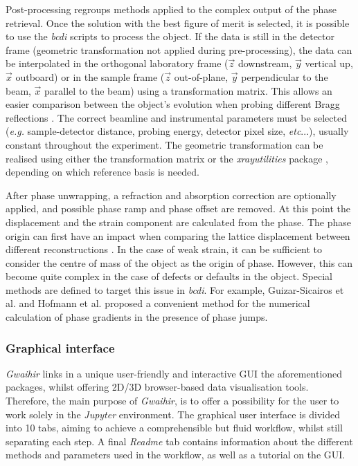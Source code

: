 Post-processing regroups methods applied to the complex output of the phase retrieval.
Once the solution with the best figure of merit is selected, it is possible to use the \textit{bcdi} scripts to process the object.
If the data is still in the detector frame (geometric transformation not applied during pre-processing), the data can be interpolated in the orthogonal laboratory frame ($\vec{z}$ downstream, $\vec{y}$ vertical up, $\vec{x}$ outboard) or in the sample frame ($\vec{z}$ out-of-plane, $\vec{y}$ perpendicular to the beam, $\vec{x}$ parallel to the beam) using a transformation matrix.
This allows an easier comparison between the object's evolution when probing different Bragg reflections \parencite{Lauraux2021}.
The correct beamline and instrumental parameters must be selected (\textit{e.g.} sample-detector distance, probing energy, detector pixel size, \textit{etc}...), usually constant throughout the experiment.
The geometric transformation can be realised using either the transformation matrix \parencite{Mark2005} or the \textit{xrayutilities} package \parencite{Kriegner2013}, depending on which reference basis is needed.

After phase unwrapping, a refraction and absorption correction are optionally applied, and possible phase ramp and phase offset are removed.
At this point the displacement and the strain component are calculated from the phase.
The phase origin can first have an impact when comparing the lattice displacement between different reconstructions \parencite{Atlan2023}.
In the case of weak strain, it can be sufficient to consider the centre of mass of the object as the origin of phase.
However, this can become quite complex in the case of defects or defaults in the object.
Special methods are defined to target this issue in \textit{bcdi}.
For example, Guizar-Sicairos et al. \parencite*{GuizarSicairos2011} and Hofmann et al. \parencite*{Hofmann2020} proposed a convenient method for the numerical calculation of phase gradients in the presence of phase jumps.

\subsubsection{Graphical interface}

\textit{Gwaihir} links in a unique user-friendly and interactive GUI the aforementioned packages, whilst offering 2D/3D browser-based data visualisation tools.
Therefore, the main purpose of \textit{Gwaihir}, is to offer a possibility for the user to work solely in the \textit{Jupyter} environment.
The graphical user interface is divided into 10 tabs, aiming to achieve a comprehensible but fluid workflow, whilst still separating each step.
A final \textit{Readme} tab contains information about the different methods and parameters used in the workflow, as well as a tutorial on the GUI.

